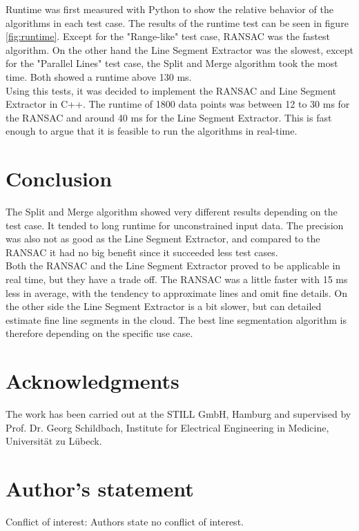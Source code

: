 \documentclass{scp}
\begin{document}
Runtime was first measured with Python to show the relative behavior of the algorithms in each test case. The results of the runtime test can be seen in figure \ref{fig:runtime}. Except for the "Range-like" test case, RANSAC was the fastest algorithm. On the other hand the Line Segment Extractor was the slowest, except for the "Parallel Lines" test case, the Split and Merge algorithm took the most time. Both showed a runtime above 130 ms. \\
Using this tests, it was decided to implement the RANSAC and Line Segment Extractor in C++. The runtime of 1800 data points was between 12 to 30 ms for the RANSAC and around 40 ms for the Line Segment Extractor. This is fast enough to argue that it is feasible to run the algorithms in real-time. 


\section{Conclusion}
The Split and Merge algorithm showed very different results depending on the test case. It tended to long runtime for unconstrained input data. The precision was also not as good as the Line Segment Extractor, and compared to the RANSAC it had no big benefit since it succeeded less test cases.  \\
Both the RANSAC and the Line Segment Extractor proved to be applicable in real time, but they have a trade off. The RANSAC was a little faster with 15 ms less in average, with the tendency to approximate lines and omit fine details. On the other side the Line Segment Extractor is a bit slower, but can detailed estimate fine line segments in the cloud. The best line segmentation algorithm is therefore depending on the specific use case.\\

\section*{Acknowledgments}
 The work has been carried out at the STILL GmbH, Hamburg and supervised by Prof. Dr. Georg Schildbach, Institute for Electrical Engineering in Medicine, Universität zu Lübeck.

\section*{Author’s statement}
\noindent Conflict of interest: Authors state no conflict of interest.

\printbibliography%
\end{document}
